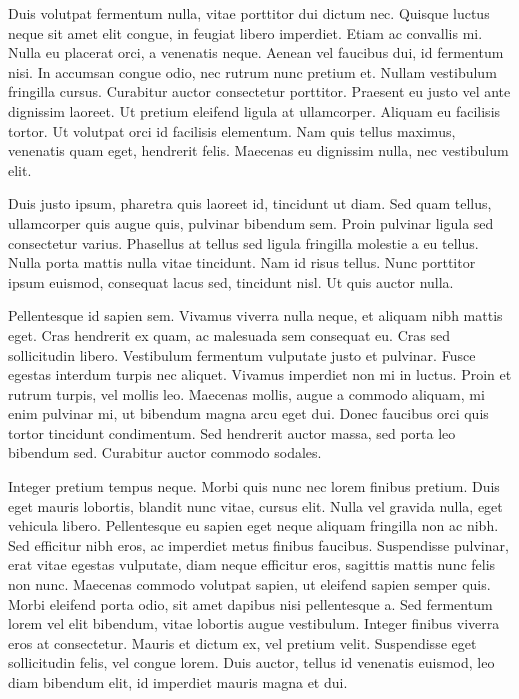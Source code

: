 \documentclass{article}
\begin{document}
Duis volutpat fermentum nulla, vitae porttitor dui dictum nec. Quisque luctus neque sit amet elit congue, in feugiat libero imperdiet. Etiam ac convallis mi. Nulla eu placerat orci, a venenatis neque. Aenean vel faucibus dui, id fermentum nisi. In accumsan congue odio, nec rutrum nunc pretium et. Nullam vestibulum fringilla cursus. Curabitur auctor consectetur porttitor. Praesent eu justo vel ante dignissim laoreet. Ut pretium eleifend ligula at ullamcorper. Aliquam eu facilisis tortor. Ut volutpat orci id facilisis elementum. Nam quis tellus maximus, venenatis quam eget, hendrerit felis. Maecenas eu dignissim nulla, nec vestibulum elit.

Duis justo ipsum, pharetra quis laoreet id, tincidunt ut diam. Sed quam tellus, ullamcorper quis augue quis, pulvinar bibendum sem. Proin pulvinar ligula sed consectetur varius. Phasellus at tellus sed ligula fringilla molestie a eu tellus. Nulla porta mattis nulla vitae tincidunt. Nam id risus tellus. Nunc porttitor ipsum euismod, consequat lacus sed, tincidunt nisl. Ut quis auctor nulla.

Pellentesque id sapien sem. Vivamus viverra nulla neque, et aliquam nibh mattis eget. Cras hendrerit ex quam, ac malesuada sem consequat eu. Cras sed sollicitudin libero. Vestibulum fermentum vulputate justo et pulvinar. Fusce egestas interdum turpis nec aliquet. Vivamus imperdiet non mi in luctus. Proin et rutrum turpis, vel mollis leo. Maecenas mollis, augue a commodo aliquam, mi enim pulvinar mi, ut bibendum magna arcu eget dui. Donec faucibus orci quis tortor tincidunt condimentum. Sed hendrerit auctor massa, sed porta leo bibendum sed. Curabitur auctor commodo sodales.

Integer pretium tempus neque. Morbi quis nunc nec lorem finibus pretium. Duis eget mauris lobortis, blandit nunc vitae, cursus elit. Nulla vel gravida nulla, eget vehicula libero. Pellentesque eu sapien eget neque aliquam fringilla non ac nibh. Sed efficitur nibh eros, ac imperdiet metus finibus faucibus. Suspendisse pulvinar, erat vitae egestas vulputate, diam neque efficitur eros, sagittis mattis nunc felis non nunc. Maecenas commodo volutpat sapien, ut eleifend sapien semper quis. Morbi eleifend porta odio, sit amet dapibus nisi pellentesque a. Sed fermentum lorem vel elit bibendum, vitae lobortis augue vestibulum. Integer finibus viverra eros at consectetur. Mauris et dictum ex, vel pretium velit. Suspendisse eget sollicitudin felis, vel congue lorem. Duis auctor, tellus id venenatis euismod, leo diam bibendum elit, id imperdiet mauris magna et dui.
\end{document}
